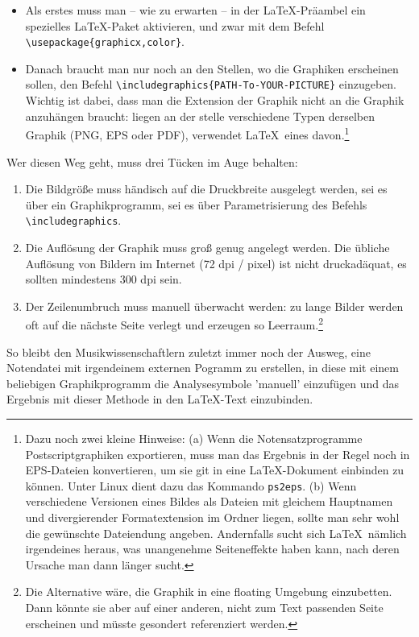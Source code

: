 \begin{itemize}
  \item Als erstes muss man -- wie zu erwarten -- in der \LaTeX-Präambel ein
  spezielles \LaTeX-Paket aktivieren, und zwar mit dem Befehl
  \texttt{\textbackslash{usepackage}\{graphicx,color\}}.
  \item Danach braucht man nur noch an den Stellen, wo die Graphiken erscheinen
  sollen, den Befehl
  \texttt{\textbackslash{includegraphics}\{PATH-To-YOUR-PICTURE\}} einzugeben.
  Wichtig ist dabei, dass man die Extension der Graphik nicht an die Graphik
  anzuhängen braucht: liegen an der stelle verschiedene Typen derselben Graphik
  (PNG, EPS oder PDF), verwendet \LaTeX\ eines davon.\footnote{Dazu noch zwei
  kleine Hinweise: (a) Wenn die Notensatzprogramme Postscriptgraphiken
  exportieren, muss man das Ergebnis in der Regel noch in EPS-Dateien
  konvertieren, um sie git in eine \LaTeX-Dokument einbinden zu können. Unter
  Linux dient dazu das Kommando \texttt{ps2eps}. (b) Wenn verschiedene
  Versionen eines Bildes als Dateien mit gleichem Hauptnamen und divergierender
  Formatextension im Ordner liegen, sollte man sehr wohl die gewünschte
  Dateiendung angeben. Andernfalls sucht sich \LaTeX\ nämlich irgendeines
  heraus, was unangenehme Seiteneffekte haben kann, nach deren Ursache man
  dann länger sucht.}
\end{itemize}

Wer diesen Weg geht, muss drei Tücken im Auge behalten:
\begin{enumerate}
  \item Die Bildgröße muss händisch auf die Druckbreite ausgelegt werden, sei es über
  ein Graphikprogramm, sei es über Parametrisierung des Befehls
  \texttt{\textbackslash{includegraphics}}.
  \item Die Auflösung der Graphik muss groß genug angelegt werden. Die übliche
  Auflösung von Bildern im Internet (72 dpi / pixel) ist nicht druckadäquat, es
  sollten mindestens 300 dpi sein.
  \item Der Zeilenumbruch muss manuell überwacht werden: zu lange Bilder werden
  oft auf die nächste Seite verlegt und erzeugen so Leerraum.\footnote{Die
  Alternative wäre, die Graphik in eine floating Umgebung einzubetten. Dann
  könnte sie aber auf einer anderen, nicht zum Text passenden Seite erscheinen
  und müsste gesondert referenziert werden.}
\end{enumerate}



So bleibt den Musikwissenschaftlern zuletzt immer noch der Ausweg, eine
Notendatei mit irgendeinem externen Pogramm zu erstellen, in diese mit einem
beliebigen Graphikprogramm die Analysesymbole 'manuell' einzufügen und das
Ergebnis mit dieser Methode in den \LaTeX-Text einzubinden.

% 
